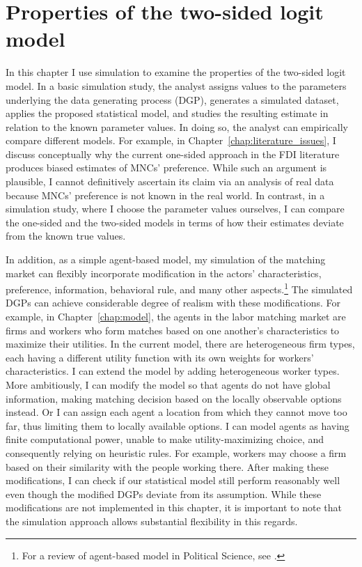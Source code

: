 \chapter{Properties of the two-sided logit model}
\label{chap:simulation}

In this chapter I use simulation to examine the properties of the two-sided
logit model. In a basic simulation study, the analyst assigns values to the
parameters underlying the data generating process (DGP), generates a simulated
dataset, applies the proposed statistical model, and studies the resulting
estimate in relation to the known parameter values. In doing so, the analyst can
empirically compare different models. For example, in
Chapter~\ref{chap:literature_issues}, I discuss conceptually why the current
one-sided approach in the FDI literature produces biased estimates of MNCs'
preference. While such an argument is plausible, I cannot definitively
ascertain its claim via an analysis of real data because MNCs' preference is not
known in the real world. In contrast, in a simulation study, where I choose the
parameter values ourselves, I can compare the one-sided and the two-sided
models in terms of how their estimates deviate from the known true values.

In addition, as a simple agent-based model, my simulation of the matching market
can flexibly incorporate modification in the actors' characteristics,
preference, information, behavioral rule, and many other aspects.\footnote{For a
  review of agent-based model in Political Science, see \citet{DeMarchi2014}.}
The simulated DGPs can achieve considerable degree of realism with these
modifications. For example, in Chapter~\ref{chap:model}, the agents in the labor
matching market are firms and workers who form matches based on one another's
characteristics to maximize their utilities. In the current model, there are
heterogeneous firm types, each having a different utility function with its own
weights for workers' characteristics. I can extend the model by adding
heterogeneous worker types. More ambitiously, I can modify the model so that
agents do not have global information, making matching decision based on the
locally observable options instead. Or I can assign each agent a location from
which they cannot move too far, thus limiting them to locally available options.
I can model agents as having finite computational power, unable to make
utility-maximizing choice, and consequently relying on heuristic rules. For
example, workers may choose a firm based on their similarity with the people
working there. After making these modifications, I can check if our statistical
model still perform reasonably well even though the modified DGPs deviate from
its assumption. While these modifications are not implemented in this chapter,
it is important to note that the simulation approach allows substantial
flexibility in this regards.

